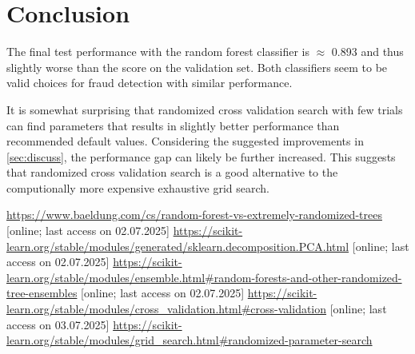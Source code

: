 \documentclass[a4, 10 pt, conference]{ieeeconf}  %
\begin{document}
\section{Conclusion}
\label{sec:con}
The final test performance with the random forest classifier is $\approx$ 0.893 and thus slightly worse than the score on the validation set. Both classifiers seem to be valid choices for fraud detection with similar performance.

It is somewhat surprising that randomized cross validation search with few trials can find parameters that results in slightly better performance than recommended default values. Considering the suggested improvements in \ref{sec:discuss}, the performance gap can likely be further increased. This suggests that randomized cross validation search is a good alternative to the computionally more expensive exhaustive grid search.

\begin{thebibliography}{xxxx}
	 \url{https://www.baeldung.com/cs/random-forest-vs-extremely-randomized-trees} [online; last access on 02.07.2025]
	 \url{https://scikit-learn.org/stable/modules/generated/sklearn.decomposition.PCA.html} [online; last access on 02.07.2025]
	 \url{https://scikit-learn.org/stable/modules/ensemble.html#random-forests-and-other-randomized-tree-ensembles} [online; last access on 02.07.2025]
	 \url{https://scikit-learn.org/stable/modules/cross_validation.html#cross-validation} [online; last access on 03.07.2025]
	 \url{https://scikit-learn.org/stable/modules/grid_search.html#randomized-parameter-search}
\end{thebibliography}
\end{document}
